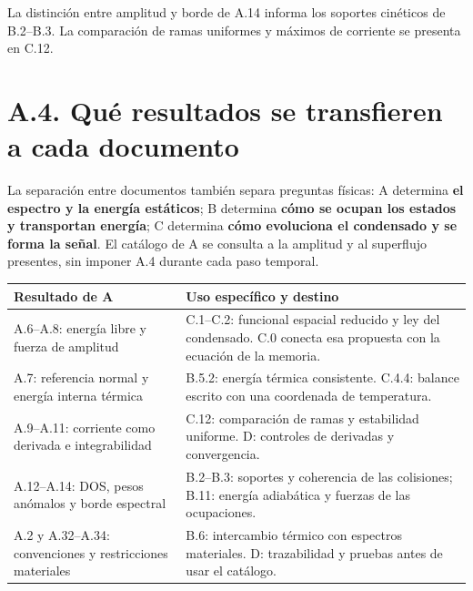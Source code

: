 \documentclass[
  spanish,
  10pt,
  a4paper,
]{article}
\newcounter{none} %
\begin{document}
La distinción entre amplitud y borde de A.14 informa los soportes
cinéticos de B.2--B.3. La comparación de ramas uniformes y máximos de
corriente se presenta en C.12.

\section{A.4. Qué resultados se transfieren a cada
documento}\label{a.4.-quuxe9-resultados-se-transfieren-a-cada-documento}

La separación entre documentos también separa preguntas físicas: A
determina \textbf{el espectro y la energía estáticos}; B determina
\textbf{cómo se ocupan los estados y transportan energía}; C determina
\textbf{cómo evoluciona el condensado y se forma la señal}. El catálogo
de A se consulta a la amplitud y al superflujo presentes, sin imponer
A.4 durante cada paso temporal.

{\def\LTcaptype{none} %
\begin{longtable}[]{@{}
  >{\raggedright\arraybackslash}p{}
  >{\raggedright\arraybackslash}p{}@{}}
\toprule\noalign{}
\begin{minipage}[b]{\linewidth}\raggedright
Resultado de A
\end{minipage} & \begin{minipage}[b]{\linewidth}\raggedright
Uso específico y destino
\end{minipage} \\
\midrule\noalign{}
\endhead
\bottomrule\noalign{}
\endlastfoot
A.6--A.8: energía libre y fuerza de amplitud & C.1--C.2: funcional
espacial reducido y ley del condensado. C.0 conecta esa propuesta con la
ecuación de la memoria. \\
A.7: referencia normal y energía interna térmica & B.5.2: energía
térmica consistente. C.4.4: balance escrito con una coordenada de
temperatura. \\
A.9--A.11: corriente como derivada e integrabilidad & C.12: comparación
de ramas y estabilidad uniforme. D: controles de derivadas y
convergencia. \\
A.12--A.14: DOS, pesos anómalos y borde espectral & B.2--B.3: soportes y
coherencia de las colisiones; B.11: energía adiabática y fuerzas de las
ocupaciones. \\
A.2 y A.32--A.34: convenciones y restricciones materiales & B.6:
intercambio térmico con espectros materiales. D: trazabilidad y pruebas
antes de usar el catálogo. \\
\end{longtable}
}
\end{document}
